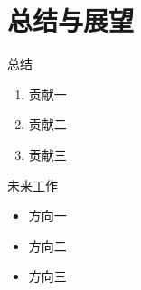 \documentclass[
    aspectratio=169,
    fontset=windows,
]{ctexbeamer}
\begin{document}
\section{总结与展望}

\begin{frame}{总结}
  \begin{enumerate}
    \item 贡献一
    \item 贡献二
    \item 贡献三
  \end{enumerate}
\end{frame}

\begin{frame}{未来工作}
  \begin{itemize}
    \item 方向一
    \item 方向二
    \item 方向三
  \end{itemize}
\end{frame}

\maketitle
\end{document}
